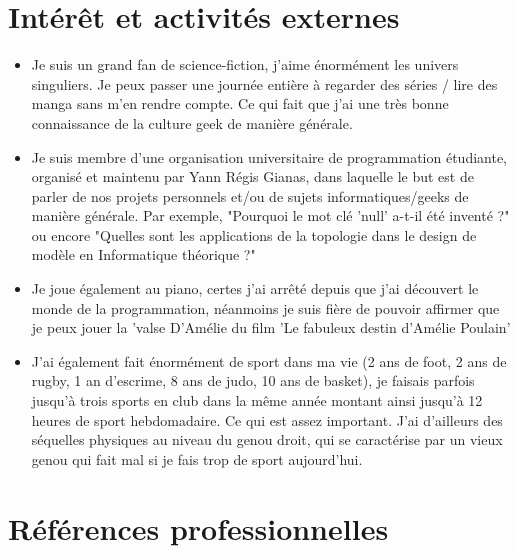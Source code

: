 \documentclass[11pt,a4paper,sans]{moderncv}        %
\begin{document}
\section{Intérêt et activités externes}

\vspace{6pt}

\begin{itemize}

\item{Je suis un grand fan de science-fiction, j'aime énormément les univers singuliers. Je peux passer une journée entière à regarder des séries / lire des manga sans m'en rendre compte. Ce qui fait que j'ai une très bonne connaissance de la culture geek de manière générale.}

\vspace{6pt}

\item{Je suis membre d'une organisation universitaire de programmation étudiante, organisé et maintenu par Yann Régis Gianas, dans laquelle le but est de parler de nos projets personnels et/ou de sujets informatiques/geeks de manière générale. Par exemple, "Pourquoi le mot clé 'null' a-t-il été inventé ?" ou encore "Quelles sont les applications de la topologie dans le design de modèle en Informatique théorique ?"}

\vspace{6pt}

\item{Je joue également au piano, certes j'ai arrêté depuis que j'ai découvert le monde de la programmation, néanmoins je suis fière de pouvoir affirmer que je peux jouer la 'valse D'Amélie du film 'Le fabuleux destin d'Amélie Poulain'}

\vspace{6pt}

\item{J'ai également fait énormément de sport dans ma vie (2 ans de foot, 2 ans de rugby, 1 an d'escrime, 8 ans de judo, 10 ans de basket), je faisais parfois jusqu'à trois sports en club dans la même année montant ainsi jusqu'à 12 heures de sport hebdomadaire. Ce qui est assez important. J'ai d'ailleurs des séquelles physiques au niveau du genou droit, qui se caractérise par un vieux genou qui fait mal si je fais trop de sport aujourd'hui.}

\end{itemize}

\section{Références professionnelles}
\end{document}
